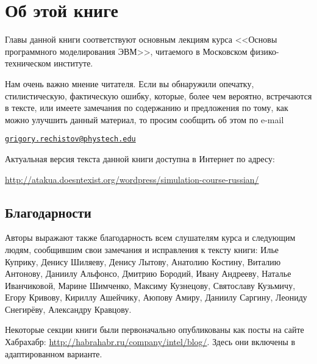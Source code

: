 \chapter*{Об этой книге}\label{chap:contrib}

Главы данной книги соответствуют основным лекциям курса <<Основы программного моделирования ЭВМ>>, читаемого в Московском физико-техническом институте.

Нам очень важно мнение читателя. Если вы обнаружили опечатку, стилистическую, фактическую ошибку, которые, более чем вероятно, встречаются в тексте, или имеете замечания по содержанию и предложения по тому, как можно улучшить данный материал, то просим сообщить об этом по e-mail 

\begin{center}
\href{mailto:grigory.rechistov@phystech.edu}{\texttt{grigory.rechistov@phystech.edu}}
\end{center}




Актуальная версия текста данной книги доступна в Интернет по адресу:

{\scriptsize\url{http://atakua.doesntexist.org/wordpress/simulation-course-russian/}}

\section*{Благодарности}

Авторы выражают также благодарность всем слушателям курса и следующим людям, сообщившим свои замечания и исправления к тексту книги: Илье Куприку, Денису Шиляеву, Денису Лытову, Анатолию Костину, Виталию Антонову, Даниилу Альфонсо, Дмитрию Бородий, Ивану Андрееву, Наталье Иванчиковой, Марине Шимченко, Максиму Кузнецову, Святославу Кузьмичу, Егору Кривову, Кириллу Ашейчику, Аюпову Амиру, Даниилу Саргину, Леониду Снегирёву, Александру Кравцову.

Некоторые секции книги были первоначально опубликованы как посты на сайте Хабрахабр: \url{http://habrahabr.ru/company/intel/blog/}. Здесь они включены в адаптированном варианте.


